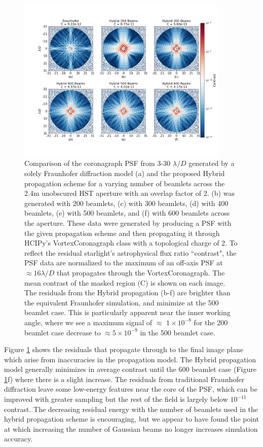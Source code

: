 \begin{figure}[H]
    \centering
    \includegraphics[width=0.9\textwidth, trim={3cm 0cm 2cm 0cm}]{coronagraph_vs_beamlets.png}
    \caption{Comparison of the coronagraph PSF from 3-30 $\lambda / D$ generated by a solely Fraunhofer diffraction model (a) and the proposed Hybrid propagation scheme for a varying number of beamlets across the 2.4m unobscured HST aperture with an overlap factor of 2. (b) was generated with 200 beamlets, (c) with 300 beamlets, (d) with 400 beamlets, (e) with 500 beamlets, and (f) with 600 beamlets across the aperture. These data were generated by producing a PSF with the given propagation scheme and then propagating it through HCIPy's VortexCoronagraph class with a topological charge of 2. To reflect the residual starlight's astrophysical flux ratio ``contrast", the PSF data are normalized to the maximum of an off-axis PSF at $\approx 16 \lambda/D$ that propagates through the VortexCoronagraph. The mean contrast of the masked region (C) is shown on each image. The residuals from the Hybrid propagation (b-f) are brighter than the equivalent Fraunhofer simulation, and minimize at the 500 beamlet case. This is particularly apparent near the inner working angle, where we see a maximum signal of $\approx$ $1 \times 10^{-8}$ for the 200 beamlet case decrease to $\approx 5 \times 10^{-9}$ in the 500 beamlet case.}
    \label{fig:nonparaxial_coronagraph}
\end{figure}

Figure \ref{fig:nonparaxial_coronagraph} shows the residuals that propagate through to the final image plane which arise from inaccuracies in the propagation model. The Hybrid propagation model generally minimizes in average contrast until the 600 beamlet case (Figure \ref{fig:nonparaxial_coronagraph}f) where there is a slight increase. The residuals from traditional Fraunhofer diffraction leave some low-energy features near the core of the PSF, which can be improved with greater sampling but the rest of the field is largely below $10^{-11}$ contrast. The decreasing residual energy with the number of beamlets used in the hybrid propagation scheme is encouraging, but we appear to have found the point at which increasing the number of Gaussian beams no longer increases simulation accuracy. 

